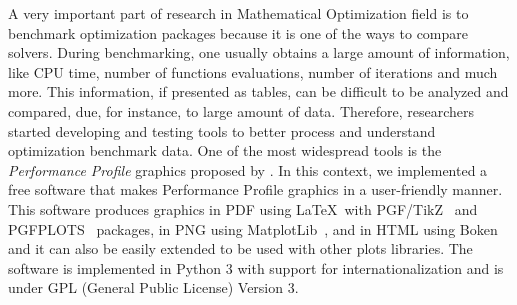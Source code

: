 A very important part of research in Mathematical Optimization field is to benchmark
optimization packages because it is one of the ways to compare
solvers.
During benchmarking, one usually
obtains a large amount of information, like CPU time, number of functions
evaluations, number of iterations and much more. This information, if
presented as tables, can be difficult to be analyzed and compared, due, for instance, to
large amount of data.  Therefore, researchers started developing and testing
tools to better process and understand optimization benchmark data. One of
the most widespread tools  is the \emph{Performance Profile} graphics proposed by
\textcite{Dolan:2002du}. In this context, we implemented a free software
that makes Performance Profile graphics in a user-friendly manner. This software produces graphics in PDF using \LaTeX\ with
PGF/TikZ~\cite{TikZ} and PGFPLOTS~\cite{pgfplots} packages, in
PNG using MatplotLib~\cite{Hunter:2007}, and in HTML using
Boken~\cite{url:bokeh} and it can also be easily
extended to be used with other plots libraries. The software is implemented
in Python 3 with support for internationalization and is under GPL (General
Public License) Version 3.
